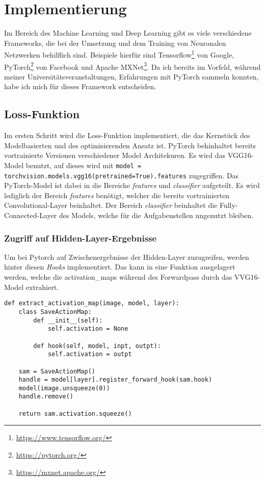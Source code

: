 \chapter{Implementierung}
\label{cha:implementation}

Im Bereich des Machine Learning und Deep Learning gibt es viele verschiedene Frameworks, die bei der Umsetzung und dem Training von Neuronalen Netzwerken
behilflich sind. Beispiele hierfür sind Tensorflow\footnote{\url{https://www.tensorflow.org/}} von Google, PyTorch\footnote{\url{https://pytorch.org/}} von Facebook und Apache MXNet\footnote{\url{https://mxnet.apache.org/}}. Da ich bereits im Vorfeld, während meiner Universitätsveranstaltungen, Erfahrungen mit PyTorch sammeln konnten, habe ich mich für dieses Framework entscheiden.

\section{Loss-Funktion}

Im ersten Schritt wird die Loss-Funktion implementiert, die das Kernstück des Modelbasierten und des optimisierenden Ansatz ist.
PyTorch behinhaltet bereits vortrainierte Versionen verschiedener Model Architekuren. Es wird das VGG16-Model benutzt, auf dieses
wird mit \texttt{model = torchvision.models.vgg16(pretrained=True).features} zugegriffen. Das PyTorch-Model ist dabei in die Bereiche \textit{features} und 
\textit{classifier} aufgeteilt. Es wird lediglich der Bereich \textit{features} benötigt, welcher die bereits vortrainierten Convolutional-Layer beinhaltet.
Der Bereich \textit{classifier} beinhaltet die Fully-Connected-Layer des Models, welche für die Aufgabenstellen ungenutzt bleiben.

\pagebreak

\subsection{Zugriff auf Hidden-Layer-Ergebnisse}

Um bei Pytorch auf Zwischenergebnisse der Hidden-Layer zuzugreifen, werden hinter diesen \textit{Hooks} implementiert. Das kann in eine Funktion ausgelagert werden, welche die \gls{activation_map}s während des Forwardpass durch das VVG16-Model extrahiert.

\begin{listing}[H]
\begin{verbatim}
def extract_activation_map(image, model, layer):
    class SaveActionMap:
        def __init__(self):
            self.activation = None

        def hook(self, model, inpt, outpt):
            self.activation = outpt

    sam = SaveActionMap()
    handle = model[layer].register_forward_hook(sam.hook)
    model(image.unsqueeze(0))
    handle.remove()

    return sam.activation.squeeze()
\end{verbatim}
\end{listing}

